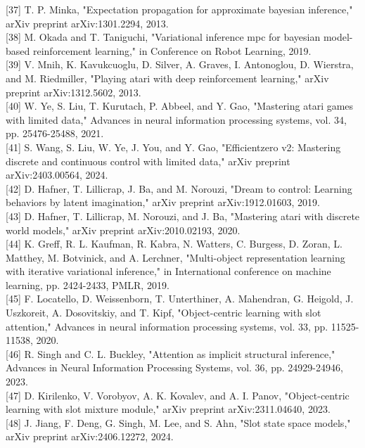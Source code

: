 \documentclass[10pt]{article}
\begin{document}
[37] T. P. Minka, "Expectation propagation for approximate bayesian inference," arXiv preprint arXiv:1301.2294, 2013.\\[0pt]
[38] M. Okada and T. Taniguchi, "Variational inference mpc for bayesian model-based reinforcement learning," in Conference on Robot Learning, 2019.\\[0pt]
[39] V. Mnih, K. Kavukcuoglu, D. Silver, A. Graves, I. Antonoglou, D. Wierstra, and M. Riedmiller, "Playing atari with deep reinforcement learning," arXiv preprint arXiv:1312.5602, 2013.\\[0pt]
[40] W. Ye, S. Liu, T. Kurutach, P. Abbeel, and Y. Gao, "Mastering atari games with limited data," Advances in neural information processing systems, vol. 34, pp. 25476-25488, 2021.\\[0pt]
[41] S. Wang, S. Liu, W. Ye, J. You, and Y. Gao, "Efficientzero v2: Mastering discrete and continuous control with limited data," arXiv preprint arXiv:2403.00564, 2024.\\[0pt]
[42] D. Hafner, T. Lillicrap, J. Ba, and M. Norouzi, "Dream to control: Learning behaviors by latent imagination," arXiv preprint arXiv:1912.01603, 2019.\\[0pt]
[43] D. Hafner, T. Lillicrap, M. Norouzi, and J. Ba, "Mastering atari with discrete world models," arXiv preprint arXiv:2010.02193, 2020.\\[0pt]
[44] K. Greff, R. L. Kaufman, R. Kabra, N. Watters, C. Burgess, D. Zoran, L. Matthey, M. Botvinick, and A. Lerchner, "Multi-object representation learning with iterative variational inference," in International conference on machine learning, pp. 2424-2433, PMLR, 2019.\\[0pt]
[45] F. Locatello, D. Weissenborn, T. Unterthiner, A. Mahendran, G. Heigold, J. Uszkoreit, A. Dosovitskiy, and T. Kipf, "Object-centric learning with slot attention," Advances in neural information processing systems, vol. 33, pp. 11525-11538, 2020.\\[0pt]
[46] R. Singh and C. L. Buckley, "Attention as implicit structural inference," Advances in Neural Information Processing Systems, vol. 36, pp. 24929-24946, 2023.\\[0pt]
[47] D. Kirilenko, V. Vorobyov, A. K. Kovalev, and A. I. Panov, "Object-centric learning with slot mixture module," arXiv preprint arXiv:2311.04640, 2023.\\[0pt]
[48] J. Jiang, F. Deng, G. Singh, M. Lee, and S. Ahn, "Slot state space models," arXiv preprint arXiv:2406.12272, 2024.\\[0pt]
\end{document}
